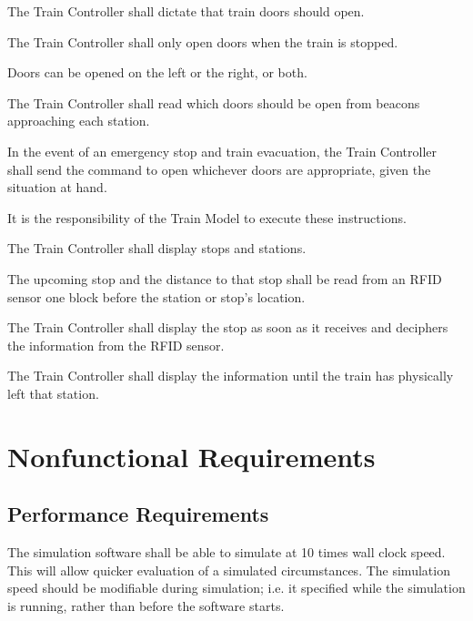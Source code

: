 \documentclass{scrreprt}
\begin{document}
\begin{numonly}
    \item The Train Controller shall dictate that train doors should open.
    \begin{numonly}
        \item The Train Controller shall only open doors when the train is stopped.
        \item Doors can be opened on the left or the right, or both.
        \item The Train Controller shall read which doors should be open from beacons approaching each station.
        \item In the event of an emergency stop and train evacuation, the Train Controller shall send the command to open whichever doors are appropriate, given the situation at hand.
        \item It is the responsibility of the Train Model to execute these instructions.
    \end{numonly}

    \item The Train Controller shall display stops and stations.
    \begin{numonly}
        \item The upcoming stop and the distance to that stop shall be read from an RFID sensor one block before the station or stop's location.
        \item The Train Controller shall display the stop as soon as it receives and deciphers the information from the RFID sensor.
        \item The Train Controller shall display the information until the train has physically left that station.
    \end{numonly}
\end{numonly}

\section{Nonfunctional Requirements}

\subsection{Performance Requirements}
The simulation software shall be able to simulate at 10 times wall clock speed.
This will allow quicker evaluation of a simulated circumstances. The simulation
speed should be modifiable during simulation; i.e. it specified while the simulation
is running, rather than before the software starts.
\end{document}
